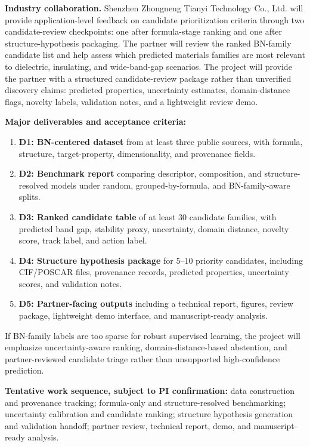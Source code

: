 \documentclass[10pt,a4paper]{article}
\begin{document}
\textbf{Industry collaboration.}
Shenzhen Zhongneng Tianyi Technology Co., Ltd. will provide application-level feedback on candidate prioritization criteria through two candidate-review checkpoints: one after formula-stage ranking and one after structure-hypothesis packaging. The partner will review the ranked BN-family candidate list and help assess which predicted materials families are most relevant to dielectric, insulating, and wide-band-gap scenarios. The project will provide the partner with a structured candidate-review package rather than unverified discovery claims: predicted properties, uncertainty estimates, domain-distance flags, novelty labels, validation notes, and a lightweight review demo.

\textbf{Major deliverables and acceptance criteria:}
\begin{enumerate}[leftmargin=*]
  \item \textbf{D1: BN-centered dataset} from at least three public sources, with formula, structure, target-property, dimensionality, and provenance fields.
  \item \textbf{D2: Benchmark report} comparing descriptor, composition, and structure-resolved models under random, grouped-by-formula, and BN-family-aware splits.
  \item \textbf{D3: Ranked candidate table} of at least 30 candidate families, with predicted band gap, stability proxy, uncertainty, domain distance, novelty score, track label, and action label.
  \item \textbf{D4: Structure hypothesis package} for 5--10 priority candidates, including CIF/POSCAR files, provenance records, predicted properties, uncertainty scores, and validation notes.
  \item \textbf{D5: Partner-facing outputs} including a technical report, figures, review package, lightweight demo interface, and manuscript-ready analysis.
\end{enumerate}
If BN-family labels are too sparse for robust supervised learning, the project will emphasize uncertainty-aware ranking, domain-distance-based abstention, and partner-reviewed candidate triage rather than unsupported high-confidence prediction.

\textbf{Tentative work sequence, subject to PI confirmation:}
data construction and provenance tracking; formula-only and structure-resolved benchmarking; uncertainty calibration and candidate ranking; structure hypothesis generation and validation handoff; partner review, technical report, demo, and manuscript-ready analysis.
\end{document}

